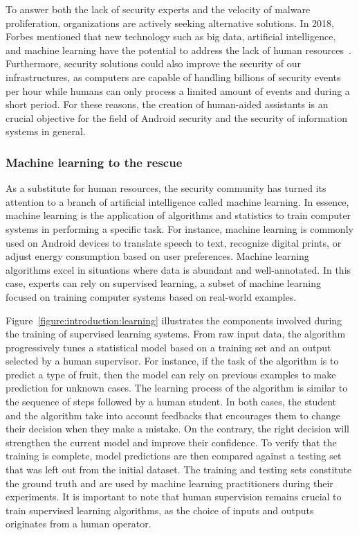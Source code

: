 To answer both the lack of security experts and the velocity of malware proliferation, organizations are actively seeking alternative solutions.
In 2018, Forbes mentioned that new technology such as big data, artificial intelligence, and machine learning have the potential to address the lack of human resources~\cite{forbes_cybersecurity_2018}.
Furthermore, security solutions could also improve the security of our infrastructures, as computers are capable of handling billions of security events per hour while humans can only process a limited amount of events and during a short period.
For these reasons, the creation of human-aided assistants is an crucial objective for the field of Android security and the security of information systems in general.
\subsubsection{Machine learning to the rescue}
As a substitute for human resources, the security community has turned its attention to a branch of artificial intelligence called machine learning.
In essence, machine learning is the application of algorithms and statistics to train computer systems in performing a specific task.
For instance, machine learning is commonly used on Android devices to translate speech to text, recognize digital prints, or adjust energy consumption based on user preferences.
Machine learning algorithms excel in situations where data is abundant and well-annotated.
In this case, experts can rely on supervised learning, a subset of machine learning focused on training computer systems based on real-world examples.

Figure~\ref{figure:introduction:learning} illustrates the components involved during the training of supervised learning systems.
From raw input data, the algorithm progressively tunes a statistical model based on a training set and an output selected by a human supervisor.
For instance, if the task of the algorithm is to predict a type of fruit, then the model can rely on previous examples to make prediction for unknown cases.
The learning process of the algorithm is similar to the sequence of steps followed by a human student.
In both cases, the student and the algorithm take into account feedbacks that encourages them to change their decision when they make a mistake.
On the contrary, the right decision will strengthen the current model and improve their confidence.
To verify that the training is complete, model predictions are then compared against a testing set that was left out from the initial dataset.
The training and testing sets constitute the ground truth and are used by machine learning practitioners during their experiments.
It is important to note that human supervision remains crucial to train supervised learning algorithms, as the choice of inputs and outputs originates from a human operator.

